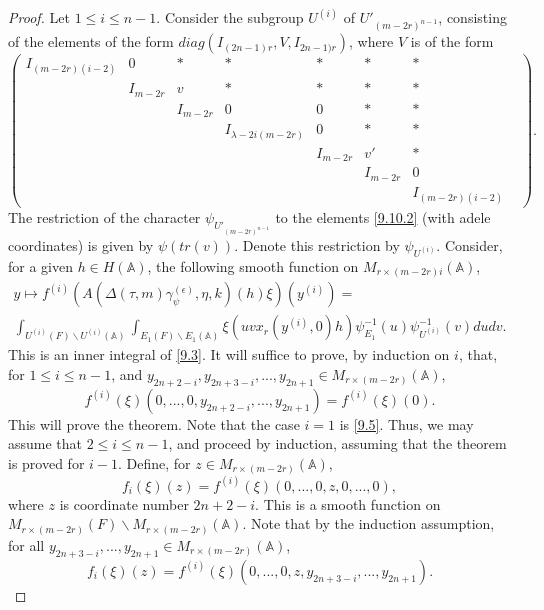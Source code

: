 \documentclass[12pts]{amsart}
\newcommand{\BA}{{\mathbb {A}}}
\begin{document}
\begin{proof} Let $1\leq i\leq n-1$. Consider the subgroup $U^{(i)}$ of $U'_{{(m-2r)}^{n-1}}$, consisting of the elements of the form $diag(I_{(2n-1)r}, V, I_{2n-1)r})$, where $V$ is of the form
\begin{equation}\label{9.10.2}
\begin{pmatrix}I_{(m-2r)(i-2)}&0&\ast&\ast&\ast&\ast&\ast\\
&I_{m-2r}&v&\ast&\ast&\ast&\ast&\\&&I_{m-2r}&0&0&\ast&\ast\\&&&I_{\lambda-2i(m-2r)}&0&\ast&\ast\\&&&&I_{m-2r}&v'&\ast\\&&&&&I_{m-2r}&0\\&&&&&&I_{(m-2r)(i-2)}\end{pmatrix}.
\end{equation}
The restriction of the character $\psi_{U'_{{(m-2r)}^{n-1}}}$ to the elements \eqref{9.10.2} (with adele coordinates) is given by $\psi(tr(v))$. Denote this restriction by $\psi_{U^{(i)}}$.
Consider, for a given $h\in H(\BA)$, the following
smooth function on
$M_{r\times (m-2r)i}(\BA)$,
\begin{multline}\label{9.10.3}
y\mapsto f^{(i)}(A(\Delta(\tau,m)\gamma_\psi^{(\epsilon)},\eta, k)(h)\xi)(y^{(i)})=\\
\int_{U^{(i)}(F)\backslash
	U^{(i)}(\BA)}\int_{E_1(F)\backslash E_1(\BA)}\xi(uvx_r(y^{(i)},0)h)\psi^{-1}_{E_1}(u)\psi^{-1}_{U^{(i)}}(v)dudv.
\end{multline}
This is an inner integral of \eqref{9.3}. It will suffice to prove, by induction on $i$, that, for
$1\leq i\leq n-1$, and  $y_{2n+2-i},y_{2n+3-i},...,y_{2n+1}\in M_{r\times(m-2r)}(\BA)$,
\begin{equation}\label{9.11}
f^{(i)}(\xi)(0,...,0,y_{2n+2-i},...,y_{2n+1})=f^{(i)}(\xi)(0).
\end{equation}
This will prove the theorem. Note that the case $i=1$ is \eqref{9.5}. Thus, we may assume that $2\leq i\leq n-1$, and proceed by induction, assuming that the theorem is proved for $i-1$. Define, for $z\in M_{r\times (m-2r)}(\BA)$,
$$
f_i(\xi)(z)=f^{(i)}(\xi)(0,...,0,z,0,...,0),
$$
where $z$ is coordinate number $2n+2-i$. This is a smooth function on\\ 
$M_{r\times (m-2r)}(F)\backslash M_{r\times (m-2r)}(\BA)$. Note that by the induction assumption, for all $y_{2n+3-i},...,y_{2n+1}\in M_{r\times(m-2r)}(\BA)$,
\begin{equation}\label{9.12}
f_i(\xi)(z)=f^{(i)}(\xi)(0,...,0,z, y_{2n+3-i},...,y_{2n+1}).

\end{equation}
\end{proof}
\end{document}
